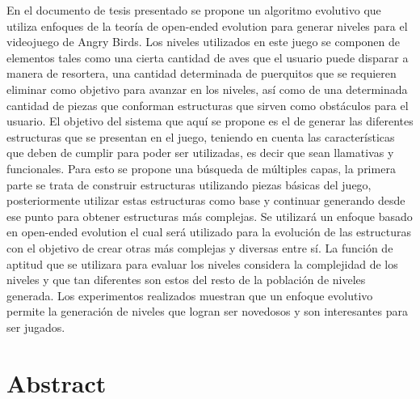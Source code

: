 % 
% 
%

En el documento de tesis presentado se propone un algoritmo evolutivo que
utiliza enfoques de la teoría de open-ended evolution para generar niveles para
el videojuego de Angry Birds. Los niveles utilizados en este juego se componen
de elementos tales como una cierta cantidad de aves que el usuario puede
disparar a manera de resortera, una cantidad determinada de puerquitos que se
requieren eliminar como objetivo para avanzar en los niveles, así como de una
determinada cantidad de piezas que conforman estructuras que sirven como
obstáculos para el usuario. El objetivo del sistema que aquí se propone es el de
generar las diferentes estructuras que se presentan en el juego, teniendo en
cuenta las características que deben de cumplir para poder ser utilizadas, es
decir que sean llamativas y funcionales. Para esto se propone una búsqueda de
múltiples capas, la primera parte se trata de construir estructuras utilizando
piezas básicas del juego, posteriormente utilizar estas estructuras como base y
continuar generando desde ese punto para obtener estructuras más complejas. Se
utilizará un enfoque basado en open-ended evolution el cual será utilizado para
la evolución de las estructuras con el objetivo de crear otras más complejas y
diversas entre sí. La función de aptitud que se utilizara para evaluar los
niveles considera la complejidad de los niveles y que tan diferentes son estos
del resto de la población de niveles generada. Los experimentos realizados
muestran que un enfoque evolutivo permite la generación de niveles que logran
ser novedosos y son interesantes para ser jugados.
 
\clearpage
\section*{Abstract}

